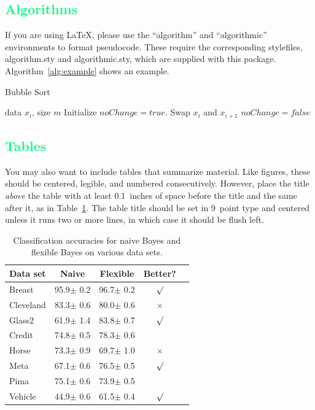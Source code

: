\documentclass{article}
\newcommand{\csubsection}[1]{\subsection{\textcolor{springgreen}{#1}}}
\begin{document}
\csubsection{Algorithms}

If you are using \LaTeX, please use the ``algorithm'' and ``algorithmic''
environments to format pseudocode. These require
the corresponding stylefiles, algorithm.sty and
algorithmic.sty, which are supplied with this package.
Algorithm~\ref{alg:example} shows an example.

\begin{algorithm}[tb]
   \caption{Bubble Sort}
   \label{alg:example}
\begin{algorithmic}
    data $x_i$, size $m$
   \REPEAT
   \STATE Initialize $noChange = true$.
   \STATE Swap $x_i$ and $x_{i+1}$
   \STATE $noChange = false$
   \ENDIF
   \ENDFOR
\end{algorithmic}
\end{algorithm}

\csubsection{Tables}

You may also want to include tables that summarize material. Like
figures, these should be centered, legible, and numbered consecutively.
However, place the title \emph{above} the table with at least
0.1~inches of space before the title and the same after it, as in
Table~\ref{sample-table}. The table title should be set in 9~point
type and centered unless it runs two or more lines, in which case it
should be flush left.


\begin{table}[t]
\caption{Classification accuracies for naive Bayes and flexible
Bayes on various data sets.}
\label{sample-table}
\vskip 0.15in
\begin{center}
\begin{small}
\begin{sc}
\begin{tabular}{lcccr}
\toprule
Data set & Naive & Flexible & Better? \\
\midrule
Breast    & 95.9$\pm$ 0.2& 96.7$\pm$ 0.2& $\surd$ \\
Cleveland & 83.3$\pm$ 0.6& 80.0$\pm$ 0.6& $\times$\\
Glass2    & 61.9$\pm$ 1.4& 83.8$\pm$ 0.7& $\surd$ \\
Credit    & 74.8$\pm$ 0.5& 78.3$\pm$ 0.6&         \\
Horse     & 73.3$\pm$ 0.9& 69.7$\pm$ 1.0& $\times$\\
Meta      & 67.1$\pm$ 0.6& 76.5$\pm$ 0.5& $\surd$ \\
Pima      & 75.1$\pm$ 0.6& 73.9$\pm$ 0.5&         \\
Vehicle   & 44.9$\pm$ 0.6& 61.5$\pm$ 0.4& $\surd$ \\
\bottomrule
\end{tabular}
\end{sc}
\end{small}
\end{center}
\vskip -0.1in
\end{table}
\end{document}
